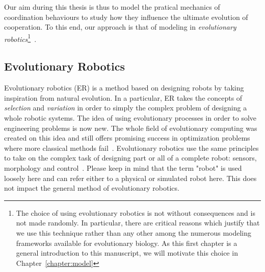    Our aim during this thesis is thus to model the pratical mechanics of coordination behaviours to study how they influence the ultimate evolution of cooperation. To this end, our approach is that of modeling in \emph{evolutionary robotics}\footnote{The choice of using evolutionary robotics is not without consequences and is not made randomly. In particular, there are critical reasons which justify that we use this technique rather than any other among the numerous modeling frameworks available for evolutionary biology. As this first chapter is a general introduction to this manuscript, we will motivate this choice in Chapter~\ref{chapter:model}}~\parencite{Nolfi2000}.


  \subsection{Evolutionary Robotics}

    Evolutionary robotics (ER) is a method based on designing robots by taking inspiration from natural evolution. In a particular, ER takes the concepts of \emph{selection} and \emph{variation} in order to simply the complex problem of designing a whole robotic systems. The idea of using evolutionary processes in order to solve engineering problems is now new. The whole field of evolutionary computing was created on this idea and still offers promising success in optimization problems where more classical methods fail~\parencite{Holland1975, Goldberg1989, Eiben2003}. Evolutionary robotics use the same principles to take on the complex task of designing part or all of a complete robot: sensors, morphology and control~\parencite{Nolfi2000, Floreano2008, Doncieux2015a}. Please keep in mind that the term "robot" is used loosely here and can refer either to a physical or simulated robot here. This does not impact the general method of evolutionary robotics.


